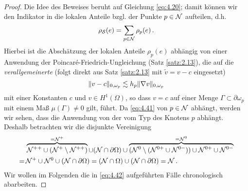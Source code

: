 \begin{proof}
Die Idee des Beweises beruht auf Gleichung \eqref{eq:4.20}; damit können wir den Indikator in die lokalen Anteile bzgl. der Punkte $p \in \mathcal N$ aufteilen, d.h.
\begin{align}\label{eq:4.40}
	\rho_{\mathcal S} (e) = \sum_{p \in \mathcal N} \rho_p (e) \, .
\end{align}
Hierbei ist die Abschätzung der lokalen Anteile $\rho_p(e)$ abhängig von einer Anwendung der Poincaré-Friedrich-Ungleichung (Satz \ref{satz:2.13}), die auf die \textit{verallgemeinerte } (folgt direkt aus Satz \ref{satz:2.13} mit $\tilde v = v-c$ eingesetzt)
\begin{align}\label{eq:4.41}
	\lVert v-c\rVert_{0,\omega_p} \lesssim h_p \lVert \nabla v\rVert_{0,\omega_p}
\end{align}
mit einer Konstanten $c$ und $v\in H^1(\Omega)$, so dass $v=c$ auf einer Menge $\Gamma \subset \partial \omega_p$ mit einem Maß $\mu (\Gamma)\not= 0$ gilt, führt. Da \eqref{eq:4.41} von $p\in \mathcal N$ abhängt, werden wir sehen, dass die Anwendung von der  vom Typ des Knotens $p$ abhängt. Deshalb betrachten wir die disjunkte Vereinigung
\begin{align}\notag
	& \overbrace{\mathcal N^{++} \cup (\mathcal N^+ \setminus \mathcal N^{++})}^{=\mathcal N^+} \cup (\mathcal N \cap \partial \Omega ) \cup\overbrace{ (\mathcal N^0 \setminus (\mathcal N^{0+} \cup \mathcal N^{0-}))  \cup \mathcal N^{0+} \cup \mathcal N^{0-}}^{= \mathcal N^0} \\
	\label{eq:4.42}
	= \, & \mathcal N^+ \cup \mathcal N^0 \cup (\mathcal N \cap \partial \Omega)  = (\mathcal N \cap \Omega) \cup (\mathcal N \cap \partial \Omega) = \mathcal N \, .
\end{align}
Wir wollen im Folgenden die in \eqref{eq:4.42} aufgeführten Fälle chronologisch abarbeiten.


\end{proof}
